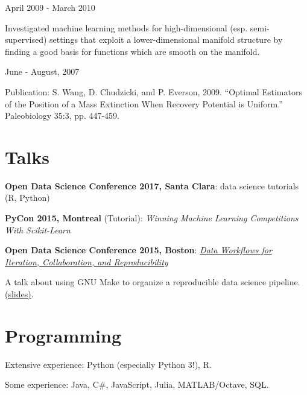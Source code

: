 \documentclass[letterpaper]{resume}
\begin{document}
{April 2009 - March 2010}
{}
{}
\begin{compactitem}
\item Investigated machine learning methods for
high-dimensional (esp. semi-supervised) settings that exploit a lower-dimensional manifold structure by finding a good
basis for functions which are smooth on the manifold.
\end{compactitem}

{June - August, 2007}
{}
{}
\begin{compactitem}

\item Publication: S. Wang, D. Chudzicki, and P. Everson, 2009. ``Optimal Estimators of the Position of a Mass Extinction When Recovery Potential is Uniform.'' Paleobiology 35:3, pp. 447-459.

\end{compactitem}

\section{Talks}

\begin{compactitem}
\item \textbf{Open Data Science Conference 2017, Santa Clara}: data science tutorials (R, Python)
\item \textbf{PyCon 2015, Montreal} (Tutorial): \textit{Winning Machine Learning Competitions With Scikit-Learn}
\item \textbf{Open Data Science Conference 2015, Boston}: \textit{\href{http://opendatascicon.com/schedule/data-workflows-for-iteration-collaboration-and-reproducibility/}{Data Workflows for Iteration, Collaboration, and Reproducibility}}
\begin{compactitem}
\item A talk about using GNU Make to organize a reproducible data science pipeline. \href{http://www.davidchudzicki.com/slides/odsc-2015-workflow/}{(slides)}.
\end{compactitem}
\end{compactitem}


\section{Programming}
\vspace{1pt}
\begin{compactitem}
\item Extensive experience: Python (especially Python 3!), R.
\item Some experience: Java, C\#, JavaScript, Julia, MATLAB/Octave, SQL.
\end{compactitem}
\end{document}
